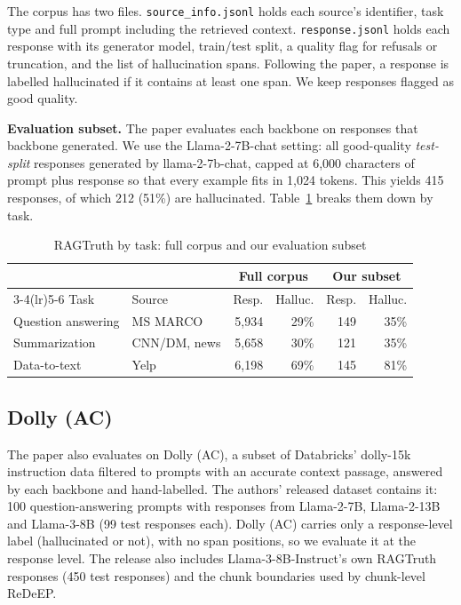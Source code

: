 \documentclass[conference]{IEEEtran}
\begin{document}
The corpus has two files. \texttt{source\_info.jsonl} holds each source's identifier, task type and full prompt including the retrieved context. \texttt{response.jsonl} holds each response with its generator model, train/test split, a quality flag for refusals or truncation, and the list of hallucination spans. Following the paper, a response is labelled hallucinated if it contains at least one span. We keep responses flagged as good quality.

\textbf{Evaluation subset.} The paper evaluates each backbone on responses that backbone generated. We use the Llama-2-7B-chat setting: all good-quality \emph{test-split} responses generated by llama-2-7b-chat, capped at 6{,}000 characters of prompt plus response so that every example fits in 1{,}024 tokens. This yields 415 responses, of which 212 (51\%) are hallucinated. Table~\ref{tab:data} breaks them down by task.

\begin{table}[t]
\caption{RAGTruth by task: full corpus and our evaluation subset}
\label{tab:data}
\centering\footnotesize
\setlength{\tabcolsep}{3pt}
\begin{tabular}{@{}llrrrr@{}}
\toprule
& & \multicolumn{2}{c}{Full corpus} & \multicolumn{2}{c}{Our subset} \\
\cmidrule(lr){3-4}\cmidrule(lr){5-6}
Task & Source & Resp. & Halluc. & Resp. & Halluc. \\
\midrule
Question answering & MS MARCO & 5,934 & 29\% & 149 & 35\% \\
Summarization & CNN/DM, news & 5,658 & 30\% & 121 & 35\% \\
Data-to-text & Yelp & 6,198 & 69\% & 145 & 81\% \\
\bottomrule
\end{tabular}
\end{table}

\subsection{Dolly (AC)}
The paper also evaluates on Dolly (AC), a subset of Databricks' dolly-15k instruction data filtered to prompts with an accurate context passage, answered by each backbone and hand-labelled. The authors' released dataset contains it: 100 question-answering prompts with responses from Llama-2-7B, Llama-2-13B and Llama-3-8B (99 test responses each). Dolly (AC) carries only a response-level label (hallucinated or not), with no span positions, so we evaluate it at the response level. The release also includes Llama-3-8B-Instruct's own RAGTruth responses (450 test responses) and the chunk boundaries used by chunk-level ReDeEP.
\end{document}
